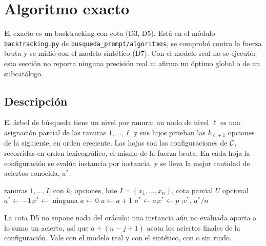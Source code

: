 \section{Algoritmo exacto}
\label{sec:exacto}

El exacto es un backtracking con cota (D3, D5). Está en el módulo
\texttt{backtracking.py} de \texttt{busqueda\_prompt/algoritmos}, se comprobó contra la fuerza bruta y
se midió con el modelo sintético (D7). Con el modelo real no se ejecutó: esta sección no
reporta ninguna precisión real ni afirma un óptimo global o de un subcatálogo.

\subsection{Descripción}

El árbol de búsqueda tiene un nivel por ranura: un nodo de nivel $\ell$ es una asignación
parcial de las ranuras $1,\dots,\ell$ y sus hijos prueban las $k_{\ell+1}$ opciones de la
siguiente, en orden creciente. Las hojas son las configuraciones de $\mathcal{C}$, recorridas en
orden lexicográfico, el mismo de la fuerza bruta. En cada hoja la configuración se evalúa
instancia por instancia, y se lleva la mejor cantidad de aciertos conocida, $a^*$.

\begin{algorithm}[h]
\caption{Backtracking con cota}
\label{alg:backtracking}
\begin{algorithmic}[1]
\Require ranuras $1,\dots,L$ con $k_i$ opciones, lote $I=(x_1,\dots,x_n)$, cota parcial $U$ opcional
\State $a^*\gets-1$;\quad $c^*\gets$ ninguna
 
    \State $a\gets 0$
       \Return {}
      \EndIf
       $a\gets a+1$ 
      \EndIf
    \EndFor
     $a^*\gets a$;\quad $c^*\gets p$
    \EndIf
    \State \Return
  \EndIf
   \Return {}
  \EndIf
    \State {}
  \EndFor
\EndProcedure
\State {};\quad \Return $c^*$, $a^*/n$
\end{algorithmic}
\end{algorithm}

La cota D5 no supone nada del oráculo: una instancia aún no evaluada aporta a lo sumo un
acierto, así que $a+(n-j+1)$ acota los aciertos finales de la configuración. Vale con el
modelo real y con el sintético, con o sin ruido.

